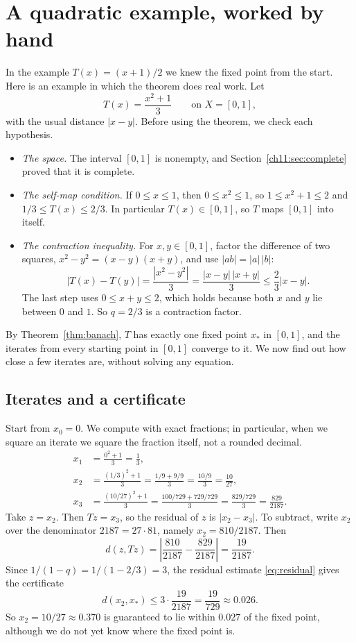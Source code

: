 \section{A quadratic example, worked by hand}\label{ch12:sec:example}
In the example $T(x)=(x+1)/2$ we knew the fixed point from the start. Here is an example in which the theorem does real work. Let
\[
T(x)=\frac{x^2+1}{3}\qquad\text{on }X=[0,1],
\]
with the usual distance $|x-y|$. Before using the theorem, we check each hypothesis.
\begin{itemize}
\item \emph{The space.} The interval $[0,1]$ is nonempty, and Section~\ref{ch11:sec:complete} proved that it is complete.
\item \emph{The self-map condition.} If $0\le x\le1$, then $0\le x^2\le1$, so $1\le x^2+1\le2$ and $1/3\le T(x)\le2/3$. In particular $T(x)\in[0,1]$, so $T$ maps $[0,1]$ into itself.
\item \emph{The contraction inequality.} For $x,y\in[0,1]$, factor the difference of two squares, $x^2-y^2=(x-y)(x+y)$, and use $|ab|=|a|\,|b|$:
\[
|T(x)-T(y)|=\frac{|x^2-y^2|}{3}=\frac{|x-y|\,|x+y|}{3}\le\frac23|x-y|.
\]
The last step uses $0\le x+y\le2$, which holds because both $x$ and $y$ lie between $0$ and $1$. So $q=2/3$ is a contraction factor.
\end{itemize}
By Theorem~\ref{thm:banach}, $T$ has exactly one fixed point $x_*$ in $[0,1]$, and the iterates from every starting point in $[0,1]$ converge to it. We now find out how close a few iterates are, without solving any equation.

\subsection*{Iterates and a certificate}
Start from $x_0=0$. We compute with exact fractions; in particular, when we square an iterate we square the fraction itself, not a rounded decimal.
\begin{align*}
x_1&=\frac{0^2+1}{3}=\frac13,\\
x_2&=\frac{(1/3)^2+1}{3}=\frac{1/9+9/9}{3}=\frac{10/9}{3}=\frac{10}{27},\\
x_3&=\frac{(10/27)^2+1}{3}=\frac{100/729+729/729}{3}=\frac{829/729}{3}=\frac{829}{2187}.
\end{align*}
Take $z=x_2$. Then $Tz=x_3$, so the residual of $z$ is $|x_2-x_3|$. To subtract, write $x_2$ over the denominator $2187=27\cdot81$, namely $x_2=810/2187$. Then
\[
d(z,Tz)=\left|\frac{810}{2187}-\frac{829}{2187}\right|=\frac{19}{2187}.
\]
Since $1/(1-q)=1/(1-2/3)=3$, the residual estimate \eqref{eq:residual} gives the certificate
\[
d(x_2,x_*)\le3\cdot\frac{19}{2187}=\frac{19}{729}\approx0.026.
\]
So $x_2=10/27\approx0.370$ is guaranteed to lie within $0.027$ of the fixed point, although we do not yet know where the fixed point is.

